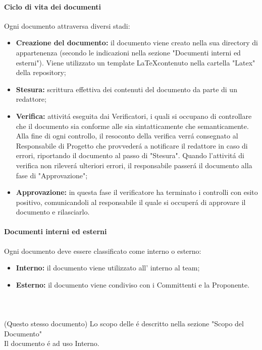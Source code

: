      \paragraph{Ciclo di vita dei documenti\\}
      Ogni documento attraversa diversi stadi:
      \begin{itemize}
        \item \textbf{Creazione del documento:} il documento viene creato nella sua directory di appartenenza (secondo le indicazioni nella sezione "Documenti interni ed esterni"). Viene utilizzato un template \LaTeX contenuto nella cartella "Latex" della repository;
        \item \textbf{Stesura:} scrittura effettiva dei contenuti del documento da parte di un redattore;
        \item \textbf{Verifica:} attivitá eseguita dai Verificatori, i quali si occupano di controllare che il documento sia conforme alle \textit{\NdP{}} sia sintatticamente che semanticamente. Alla fine di ogni controllo, il resoconto della verifica verrá consegnato al Responsabile di Progetto che provvederá a notificare il redattore in caso di errori, riportando il documento al passo di "Stesura". Quando l'attivitá di verifica non rileverá ulteriori errori, il responsabile passerá il documento alla fase di "Approvazione";
        \item \textbf{Approvazione:} in questa fase il verificatore ha terminato i controlli con esito positivo, comunicandoli al responsabile il quale si occuperá di approvare il documento e rilasciarlo.
      \end{itemize}

      \paragraph{Documenti interni ed esterni\\}
      Ogni documento deve essere classificato come interno o esterno:
      \begin{itemize}
        \item \textbf{Interno:} il documento viene utilizzato all' interno al team;
        \item \textbf{Esterno:} il documento viene condiviso con i Committenti e la Proponente.
      \end{itemize}

      \paragraph{\NdP\\}
      (Questo stesso documento) Lo scopo delle \textit{\NdP{}} é descritto nella sezione  "Scopo del Documento"\\
      Il documento é ad uso Interno.

